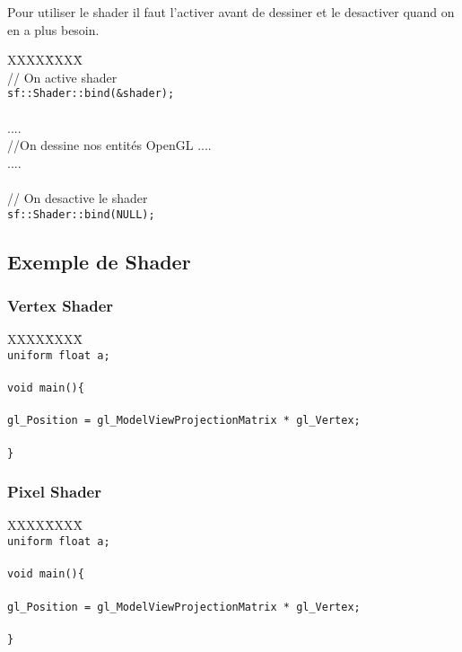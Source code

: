 Pour utiliser le shader il faut l'activer avant de dessiner et le desactiver quand on en a plus besoin.


\begin{tabbing}
XXXX\=XXXX\= \kill\\
\> // On active shader\\
\> \verb|sf::Shader::bind(&shader);|\\
\\
\> ....\\
\> //On dessine nos entités OpenGL ....\\
\> ....\\
\\
\> // On desactive le shader\\
\> \verb|sf::Shader::bind(NULL);|\\
\end{tabbing}

\subsection{Exemple de Shader}
\subsubsection{Vertex Shader}

\begin{tabbing}
XXXX\=XXXX\= \kill\\
\> \verb|uniform float a;| \\
\> \\
\> \verb|void main(){|\\
\> \\
\> \verb|gl_Position = gl_ModelViewProjectionMatrix * gl_Vertex;|\\
\> \\
\> \verb|}|\\
\end{tabbing}


\subsubsection{Pixel Shader}

\begin{tabbing}
XXXX\=XXXX\= \kill\\
\> \verb|uniform float a;| \\
\> \\
\> \verb|void main(){|\\
\> \\
\> \verb|gl_Position = gl_ModelViewProjectionMatrix * gl_Vertex;|\\
\> \\
\> \verb|}|\\
\end{tabbing}